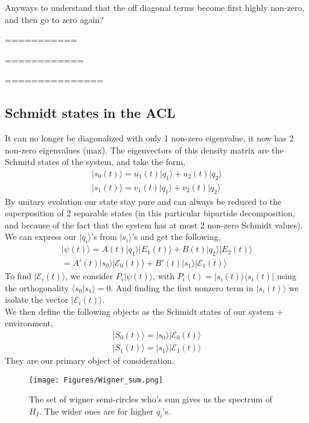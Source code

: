 \documentclass{article}
\begin{document}
Anyways to understand that the off diagonal terms become first highly non-zero, and then go to zero again?


===========


============



===============

\subsection{Schmidt states in the ACL}

It can no longer be diagonalized with only 1 non-zero eigenvalue, it now has 2 non-zero eigenvalues (max). The eigenvectors of this density matrix are the Schmitd states of the system, and take the form,
\begin{align*}
    |s_0(t)\rangle = u_1(t)|q_1\rangle + u_2(t)|q_2\rangle\\
    |s_1(t)\rangle = v_1(t)|q_1\rangle + v_2(t)|q_2\rangle
\end{align*}
By unitary evolution our state stay pure and can always be reduced to the superposition of 2 separable states (in this particular bipartide decomposition, and because of the fact that the system has at most 2 non-zero Schmidt values). We can express our $|q_i\rangle$'s from $|s_i\rangle$'s and get the following, 
\begin{align*}
    |\psi(t)\rangle = A(t)|q_1\rangle|E_1(t)\rangle+B(t)|q_2\rangle|E_2(t)\rangle \\
    =A'(t)|s_0\rangle|\mathcal{E}_0(t)\rangle+B'(t)|s_1\rangle|\mathcal{E}_1(t)\rangle
\end{align*}
To find $|\mathcal{E}_i(t)\rangle$, we consider $P_i|\psi(t)\rangle$, with $P_i(t)=|s_i(t)\rangle\langle s_i(t)|$ using the orthogonality $\langle s_0|s_1 \rangle=0$. And finding the first nonzero term in $|s_i(t)\rangle$ we isolate the vector $|\mathcal{E}_i(t)\rangle$. \\
We then define the following objects as the Schmidt states of our system + environment,
\begin{align*}
    |S_0(t)\rangle = |s_0\rangle|\mathcal{E}_0(t)\rangle
    \\
    |S_1(t)\rangle = |s_1\rangle|\mathcal{E}_1(t)\rangle
\end{align*}
They are our primary object of consideration.



\begin{figure}[h]
    \centering
    \texttt{[image: Figures/Wigner\_sum.png]}
    \caption{The set of wigner semi-circles who's sum gives us the spectrum of $H_I$. The wider ones are for higher $q_i$'s.}
    \label{fig:wigner_sum}
\end{figure}
\end{document}
